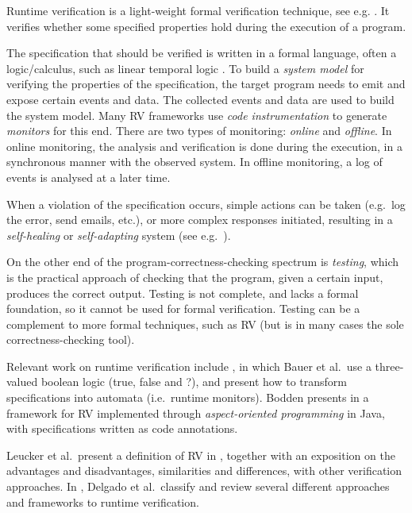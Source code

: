 \documentclass[a4paper,11pt]{kth-mag}
\begin{document}
Runtime verification is a light-weight formal verification technique, see e.g.
\cite{leucker09abriefaccount,delgado04taxonomy}.  It verifies whether some
specified properties hold during the execution of a program.

The specification that should be verified is written in a formal language,
often a logic/calculus, such as linear temporal logic \cite{pnueli77}. To build
a \emph{system model} for verifying the properties of the specification, the
target program needs to emit and expose certain events and data. The collected
events and data are used to build the system model. Many RV frameworks use
\textit{code instrumentation} to generate \textit{monitors} for this end. There
are two types of monitoring: \emph{online} and \emph{offline}.  In online
monitoring, the analysis and verification is done during the execution, in a
synchronous manner with the observed system. In offline monitoring, a log of
events is analysed at a later time.

When a violation of the specification occurs, simple actions can be taken
(e.g.\ log the error, send emails, etc.), or more complex responses initiated,
resulting in a \textit{self-healing} or \textit{self-adapting} system (see
e.g.\ \cite{huebscher08}).

On the other end of the program-correctness-checking spectrum is
\emph{testing}, which is the practical approach of checking that the program,
given a certain input, produces the correct output.  Testing is not complete,
and lacks a formal foundation, so it cannot be used for formal verification.
Testing can be a complement to more formal techniques, such as RV (but is in
many cases the sole correctness-checking tool).

Relevant work on runtime verification include \cite{bauer06}, in which Bauer et
al.\ use a three-valued boolean logic (true, false and ?), and present how to
transform specifications into automata (i.e.\ runtime monitors). Bodden
presents in \cite{bodden05efficientrv} a framework for RV implemented through
\emph{aspect-oriented programming} \cite{aspectj} in Java, with specifications
written as code annotations.

Leucker et al.\ present a definition of RV in \cite{leucker09abriefaccount},
together with an exposition on the advantages and disadvantages, similarities
and differences, with other verification approaches. In
\cite{delgado04taxonomy}, Delgado et al.\ classify and review several different
approaches and frameworks to runtime verification.
\end{document}
